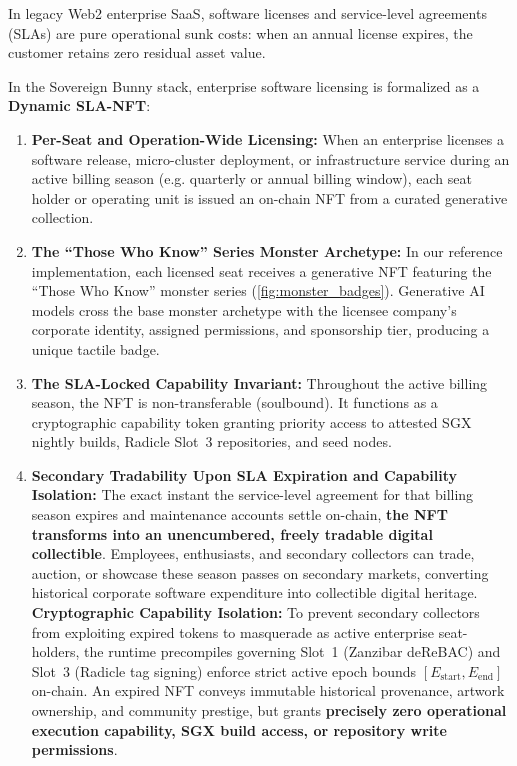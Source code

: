 \documentclass[a4paper,11pt,twoside,parskip=half-,headings=small]{scrartcl}
\begin{document}
In legacy Web2 enterprise SaaS, software licenses and service-level agreements (SLAs) are pure operational
sunk costs: when an annual license expires, the customer retains zero residual asset value.

In the Sovereign Bunny stack, enterprise software licensing is formalized as a \textbf{Dynamic SLA-NFT}:
\begin{enumerate}
  \item \textbf{Per-Seat and Operation-Wide Licensing:} When an enterprise licenses a software release,
micro-cluster deployment, or infrastructure service during an active billing season (e.g. quarterly or annual billing window),
each seat holder or operating unit is issued an on-chain NFT from a curated generative collection.
  \item \textbf{The ``Those Who Know'' Series Monster Archetype:} In our reference implementation, each licensed seat
receives a generative NFT featuring the ``Those Who Know'' monster series (\cref{fig:monster_badges}).
Generative AI models cross the base monster archetype with the licensee company's corporate identity, assigned permissions,
and sponsorship tier, producing a unique tactile badge.
  \item \textbf{The SLA-Locked Capability Invariant:} Throughout the active billing season, the NFT is non-transferable (soulbound).
It functions as a cryptographic capability token granting priority access to attested SGX nightly builds, Radicle Slot~3 repositories,
and seed nodes.
  \item \textbf{Secondary Tradability Upon SLA Expiration and Capability Isolation:} The exact instant the service-level agreement for that billing season
expires and maintenance accounts settle on-chain, \textbf{the NFT transforms into an unencumbered, freely tradable digital collectible}.
Employees, enthusiasts, and secondary collectors can trade, auction, or showcase these season passes on secondary markets,
converting historical corporate software expenditure into collectible digital heritage.
\textbf{Cryptographic Capability Isolation:} To prevent secondary collectors from exploiting expired tokens to masquerade as active enterprise seat-holders, the runtime precompiles governing Slot~1 (Zanzibar deReBAC) and Slot~3 (Radicle tag signing) enforce strict active epoch bounds $[E_{\text{start}}, E_{\text{end}}]$ on-chain. An expired NFT conveys immutable historical provenance, artwork ownership, and community prestige, but grants \textbf{precisely zero operational execution capability, SGX build access, or repository write permissions}.
\end{enumerate}
\end{document}
